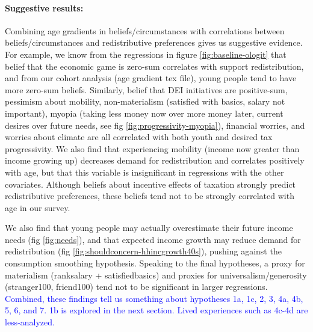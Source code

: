 \documentclass{article}
\newcommand{\blue}[1]{\textcolor{blue}{#1}}
\begin{document}
\paragraph{Suggestive results:} Combining age gradients in beliefs/circumstances with correlations between beliefs/circumstances and redistributive preferences gives us suggestive evidence. For example, we know from the regressions in figure \ref{fig:baseline-ologit} that belief that the economic game is zero-sum correlates with support redistribution, and from our cohort analysis (age gradient tex file), young people tend to have more zero-sum beliefs. Similarly, belief that DEI initiatives are positive-sum, pessimism about mobility, non-materialism (satisfied with basics, salary not important), myopia (taking less money now over more money later, current desires over future needs, see fig \ref{fig:progressivity-myopia}), financial worries, and worries about climate are all correlated with both youth and desired tax progressivity. We also find that experiencing mobility (income now greater than income growing up) decreases demand for redistribution and correlates positively with age, but that this variable is insignificant in regressions with the other covariates. Although beliefs about incentive effects of taxation strongly predict redistributive preferences, these beliefs tend not to be strongly correlated with age in our survey.

We also find that young people may actually overestimate their future income needs (fig \ref{fig:needs}), and that expected income growth may reduce demand for redistribution (fig \ref{fig:shouldconcern-hhincgrowth40s}), pushing against the consumption smoothing hypothesis. Speaking to the final hypotheses, a proxy for materialism (ranksalary + satisfiedbasics) and proxies for universalism/generosity (stranger100, friend100) tend not to be significant in larger regressions.
\blue{Combined, these findings tell us something about hypotheses 1a, 1c, 2, 3, 4a, 4b, 5, 6, and 7. 1b is explored in the next section. Lived experiences such as 4c-4d are less-analyzed.}

\end{document}
